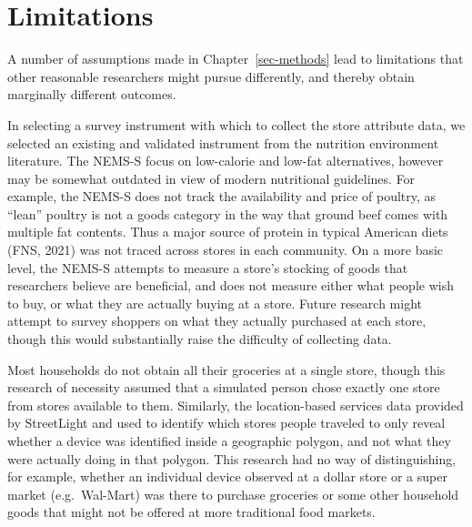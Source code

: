 \documentclass[
  letterpaper,
  DIV=11,
  numbers=noendperiod]{scrreport}
\begin{document}
\hypertarget{sec-limitations}{%
\section{Limitations}\label{sec-limitations}}

A number of assumptions made in Chapter~\ref{sec-methods} lead to
limitations that other reasonable researchers might pursue differently,
and thereby obtain marginally different outcomes.

In selecting a survey instrument with which to collect the store
attribute data, we selected an existing and validated instrument from
the nutrition environment literature. The NEMS-S focus on low-calorie
and low-fat alternatives, however may be somewhat outdated in view of
modern nutritional guidelines. For example, the NEMS-S does not track
the availability and price of poultry, as ``lean'' poultry is not a
goods category in the way that ground beef comes with multiple fat
contents. Thus a major source of protein in typical American diets (FNS,
2021) was not traced across stores in each community. On a more basic
level, the NEMS-S attempts to measure a store's stocking of goods that
researchers believe are beneficial, and does not measure either what
people wish to buy, or what they are actually buying at a store. Future
research might attempt to survey shoppers on what they actually
purchased at each store, though this would substantially raise the
difficulty of collecting data.

Most households do not obtain all their groceries at a single store,
though this research of necessity assumed that a simulated person chose
exactly one store from stores available to them. Similarly, the
location-based services data provided by StreetLight and used to
identify which stores people traveled to only reveal whether a device
was identified inside a geographic polygon, and not what they were
actually doing in that polygon. This research had no way of
distinguishing, for example, whether an individual device observed at a
dollar store or a super market (e.g.~Wal-Mart) was there to purchase
groceries or some other household goods that might not be offered at
more traditional food markets.
\end{document}
